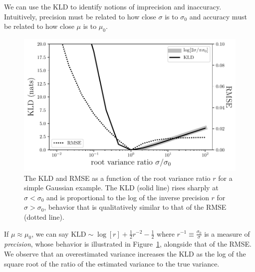 \documentclass[\docopts]{\docclass}
\begin{document}
We can use the KLD to identify notions of imprecision and inaccuracy.
Intuitively, precision must be related to how close $\sigma$ is to $\sigma_{0}$ 
and accuracy must be related to how close $\mu$ is to $\mu_{0}$.

\begin{figure}
  \begin{center}
    \includegraphics[width=\columnwidth]{figures/precision.pdf}
    \caption{The KLD and RMSE as a function of the root variance ratio $r$ for 
a simple Gaussian example.
    The KLD (solid line) rises sharply at $\sigma<\sigma_{0}$ and is 
proportional to the log of the inverse precision $r$ for $\sigma>\sigma_{0}$, 
behavior that is qualitatively similar to that of the RMSE (dotted line).
    \label{fig:precision}}
  \end{center}
\end{figure}

If $\mu\approx\mu_{0}$, we can say $\mathrm{KLD}\sim\log[r] + \frac{1}{2}r^{-2} 
- \frac{1}{2}$ where $r^{-1}\equiv\frac{\sigma_{0}}{\sigma}$ is a measure of 
\textit{precision}, whose behavior is illustrated in 
Figure~\ref{fig:precision}, alongside that of the RMSE.  We observe that an 
overestimated variance increases the KLD as the log of the square root of the 
ratio of the estimated variance to the true variance.
\end{document}
